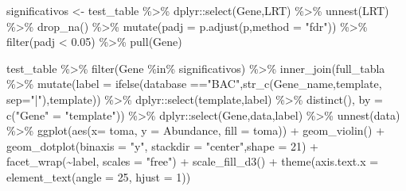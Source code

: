 \documentclass[
  letterpaper,
  DIV=11,
  numbers=noendperiod]{scrartcl}
\newenvironment{Shaded}{\begin{snugshade}}{\end{snugshade}}
\newcommand{\AttributeTok}[1]{\textcolor[rgb]{0.40,0.45,0.13}{#1}}
\newcommand{\DecValTok}[1]{\textcolor[rgb]{0.68,0.00,0.00}{#1}}
\newcommand{\FloatTok}[1]{\textcolor[rgb]{0.68,0.00,0.00}{#1}}
\newcommand{\FunctionTok}[1]{\textcolor[rgb]{0.28,0.35,0.67}{#1}}
\newcommand{\NormalTok}[1]{\textcolor[rgb]{0.00,0.23,0.31}{#1}}
\newcommand{\OtherTok}[1]{\textcolor[rgb]{0.00,0.23,0.31}{#1}}
\newcommand{\SpecialCharTok}[1]{\textcolor[rgb]{0.37,0.37,0.37}{#1}}
\newcommand{\StringTok}[1]{\textcolor[rgb]{0.13,0.47,0.30}{#1}}
\begin{document}
\begin{Shaded}
\begin{Highlighting}[]
\NormalTok{significativos }\OtherTok{\textless{}{-}}\NormalTok{ test\_table }\SpecialCharTok{\%\textgreater{}\%} 
\NormalTok{  dplyr}\SpecialCharTok{::}\FunctionTok{select}\NormalTok{(Gene,LRT) }\SpecialCharTok{\%\textgreater{}\%} 
  \FunctionTok{unnest}\NormalTok{(LRT) }\SpecialCharTok{\%\textgreater{}\%} 
  \FunctionTok{drop\_na}\NormalTok{() }\SpecialCharTok{\%\textgreater{}\%} 
  \FunctionTok{mutate}\NormalTok{(}\AttributeTok{padj =} \FunctionTok{p.adjust}\NormalTok{(p,}\AttributeTok{method =} \StringTok{"fdr"}\NormalTok{)) }\SpecialCharTok{\%\textgreater{}\%} 
  \FunctionTok{filter}\NormalTok{(padj }\SpecialCharTok{\textless{}} \FloatTok{0.05}\NormalTok{) }\SpecialCharTok{\%\textgreater{}\%} \FunctionTok{pull}\NormalTok{(Gene)}

\NormalTok{test\_table }\SpecialCharTok{\%\textgreater{}\%} 
  \FunctionTok{filter}\NormalTok{(Gene }\SpecialCharTok{\%in\%}\NormalTok{ significativos) }\SpecialCharTok{\%\textgreater{}\%} 
  \FunctionTok{inner\_join}\NormalTok{(full\_tabla }\SpecialCharTok{\%\textgreater{}\%} 
               \FunctionTok{mutate}\NormalTok{(}\AttributeTok{label =} \FunctionTok{ifelse}\NormalTok{(database }\SpecialCharTok{==}\StringTok{"BAC"}\NormalTok{,}\FunctionTok{str\_c}\NormalTok{(Gene\_name,template, }\AttributeTok{sep=}\StringTok{"|"}\NormalTok{),template)) }\SpecialCharTok{\%\textgreater{}\%}\NormalTok{ dplyr}\SpecialCharTok{::}\FunctionTok{select}\NormalTok{(template,label) }\SpecialCharTok{\%\textgreater{}\%} \FunctionTok{distinct}\NormalTok{(), }\AttributeTok{by =} \FunctionTok{c}\NormalTok{(}\StringTok{"Gene"} \OtherTok{=} \StringTok{"template"}\NormalTok{)) }\SpecialCharTok{\%\textgreater{}\%} 
\NormalTok{  dplyr}\SpecialCharTok{::}\FunctionTok{select}\NormalTok{(Gene,data,label) }\SpecialCharTok{\%\textgreater{}\%} 
  \FunctionTok{unnest}\NormalTok{(data) }\SpecialCharTok{\%\textgreater{}\%} 
  \FunctionTok{ggplot}\NormalTok{(}\FunctionTok{aes}\NormalTok{(}\AttributeTok{x=}\NormalTok{ toma, }\AttributeTok{y =}\NormalTok{ Abundance, }\AttributeTok{fill =}\NormalTok{ toma)) }\SpecialCharTok{+} 
  \FunctionTok{geom\_violin}\NormalTok{() }\SpecialCharTok{+}
  \FunctionTok{geom\_dotplot}\NormalTok{(}\AttributeTok{binaxis =} \StringTok{"y"}\NormalTok{, }\AttributeTok{stackdir =} \StringTok{"center"}\NormalTok{,}\AttributeTok{shape =} \DecValTok{21}\NormalTok{) }\SpecialCharTok{+}
  \FunctionTok{facet\_wrap}\NormalTok{(}\SpecialCharTok{\textasciitilde{}}\NormalTok{label, }\AttributeTok{scales =} \StringTok{"free"}\NormalTok{) }\SpecialCharTok{+}
  \FunctionTok{scale\_fill\_d3}\NormalTok{() }\SpecialCharTok{+} 
  \FunctionTok{theme}\NormalTok{(}\AttributeTok{axis.text.x =} \FunctionTok{element\_text}\NormalTok{(}\AttributeTok{angle =} \DecValTok{25}\NormalTok{, }\AttributeTok{hjust =} \DecValTok{1}\NormalTok{))}
\end{Highlighting}
\end{Shaded}
\end{document}
